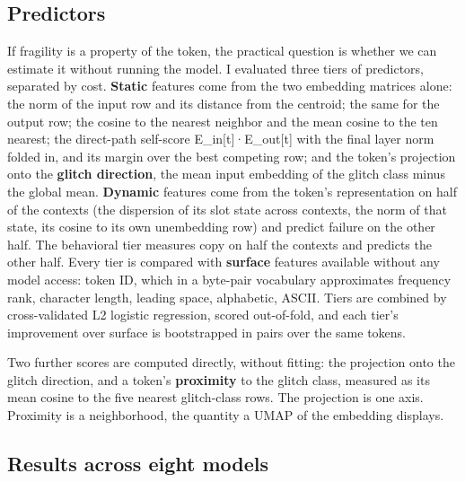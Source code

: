 \documentclass[11pt]{article}
\begin{document}
\subsection{Predictors}\label{predictors}

If fragility is a property of the token, the practical question is whether we can estimate it without running the model. I evaluated three tiers of predictors, separated by cost. \textbf{Static} features come from the two embedding matrices alone: the norm of the input row and its distance from the centroid; the same for the output row; the cosine to the nearest neighbor and the mean cosine to the ten nearest; the direct-path self-score E\_in{[}t{]}·E\_out{[}t{]} with the final layer norm folded in, and its margin over the best competing row; and the token's projection onto the \textbf{glitch direction}, the mean input embedding of the glitch class minus the global mean. \textbf{Dynamic} features come from the token's representation on half of the contexts (the dispersion of its slot state across contexts, the norm of that state, its cosine to its own unembedding row) and predict failure on the other half. The behavioral tier measures copy on half the contexts and predicts the other half. Every tier is compared with \textbf{surface} features available without any model access: token ID, which in a byte-pair vocabulary approximates frequency rank, character length, leading space, alphabetic, ASCII. Tiers are combined by cross-validated L2 logistic regression, scored out-of-fold, and each tier's improvement over surface is bootstrapped in pairs over the same tokens.

Two further scores are computed directly, without fitting: the projection onto the glitch direction, and a token's \textbf{proximity} to the glitch class, measured as its mean cosine to the five nearest glitch-class rows. The projection is one axis. Proximity is a neighborhood, the quantity a UMAP of the embedding displays.

\subsection{Results across eight models}\label{results-across-eight-models}

\begingroup\footnotesize\setlength{\tabcolsep}{4pt}\renewcommand{\arraystretch}{1.15}
\end{document}
